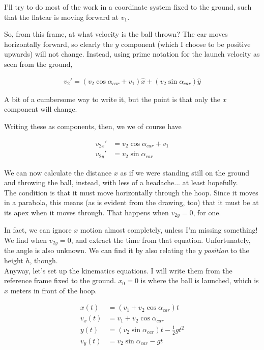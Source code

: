 \documentclass[8.01x]{subfiles}
\begin{document}
I'll try to do most of the work in a coordinate system fixed to the ground, such that the flatcar is moving forward at $v_1$.

So, from this frame, at what velocity is the ball thrown? The car moves horizontally forward, so clearly the $y$ component (which I choose to be positive upwards) will not change. Instead, using prime notation for the launch velocity as seen from the ground,

\begin{align}
v_2' = (v_2 \cos \alpha_{car} + v_1) \hat{x} + (v_2 \sin \alpha_{car}) \hat{y}
\end{align}

A bit of a cumbersome way to write it, but the point is that only the $x$ component will change.

Writing these as components, then, we we of course have

\begin{align}
v_{2x}' &= v_2 \cos \alpha_{car} + v_1\\
v_{2y}' &= v_2 \sin \alpha_{car}
\end{align}

We can now calculate the distance $x$ as if we were standing still on the ground and throwing the ball, instead, with less of a headache... at least hopefully.\\
The condition is that it must move horizontally through the hoop. Since it moves in a parabola, this means (as is evident from the drawing, too) that it must be at its apex when it moves through. That happens when $v_{2y} = 0$, for one.

In fact, we can ignore $x$ motion almost completely, unless I'm missing something! We find when $v_{2y} = 0$, and extract the time from that equation. Unfortunately, the angle is also unknown. We can find it by also relating the $y$ \emph{position} to the height $h$, though.\\
Anyway, let's set up the kinematics equations. I will write them from the reference frame fixed to the ground. $x_0 = 0$ is where the ball is launched, which is $x$ meters in front of the hoop.

\begin{align}
x(t)   &= (v_1  + v_2 \cos \alpha_{car}) t\\
v_x(t) &= v_1 + v_2 \cos \alpha_{car}\\
y(t)   &= (v_2 \sin \alpha_{car}) t - \frac{1}{2} g t^2\\
v_y(t) &= v_2 \sin \alpha_{car} - g t
\end{align}
\end{document}
